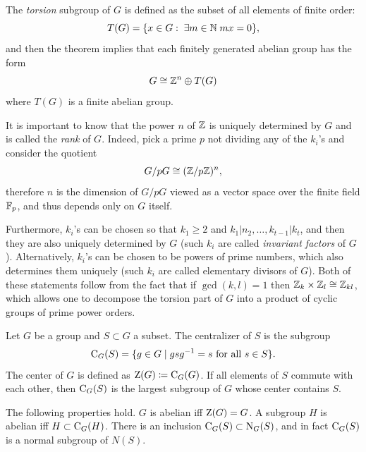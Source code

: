 \begin{rem}
    The \emph{torsion} subgroup of $G$ is defined as the subset of all elements of finite order:
    \[T(G)=\{x\in G:\;\exists m\in\mathbb{N}\; mx=0\},\]
    and then the theorem implies that each finitely generated abelian group has the form
    \[G\cong \mathbb{Z}^n\oplus T(G)\]
    where $T(G)$ is a finite abelian group.
    
    It is important to know that the power $n$ of $\mathbb{Z}$ is uniquely determined by $G$ and is called the \emph{rank} of $G$. Indeed, pick a prime $p$ not dividing any of the $k_i$'s and consider the quotient
    \[G\slash pG\cong (\mathbb{Z}\slash p\mathbb{Z})^n,\]
    therefore $n$ is the dimension of $G\slash pG$ viewed as a vector space over the finite field $\mathbb{F}_p$, and thus depends only on $G$ itself.

    Furthermore, $k_i$'s can be chosen so that $k_1\geq 2$ and $k_1|n_2,\ldots, k_{t-1}|k_t$, and then they are also uniquely determined by $G$ (such $k_i$ are called \emph{invariant factors} of $G$). Alternatively, $k_i$'s can be chosen to be powers of prime numbers, which also determines them uniquely (such $k_i$ are called elementary divisors of $G$). Both of these statements follow from the fact that if $\gcd(k,l)=1$ then $\mathbb{Z}_k\times \mathbb{Z}_l\cong \mathbb{Z}_{kl}$, which allows one to decompose the torsion part of $G$ into a product of cyclic groups of prime power orders.
\end{rem}


\begin{defn}[Centralizer]
    Let $G$ be a group and $S\subset G$ a subset. The centralizer of $S$ is the subgroup
    \[\mathrm{C}_G(S)=\{g\in G\mid gsg^{-1}=s \text{ for all }s\in S\}.\]
    The center of $G$ is defined as $\mathrm{Z}(G)\coloneqq \mathrm{C}_G(G)$. If all elements of $S$ commute with each other, then $\mathrm{C}_G(S)$ is the largest subgroup of $G$ whose center contains $S$.
    
    The following properties hold. $G$ is abelian iff $\mathrm{Z}(G)=G$. A subgroup $H$ is abelian iff $H\subset \mathrm{C}_G(H)$. There is an inclusion $\mathrm{C}_G(S)\subset \mathrm{N}_G(S)$, and in fact $\mathrm{C}_G(S)$ is a normal subgroup of $N(S)$.
\end{defn}

